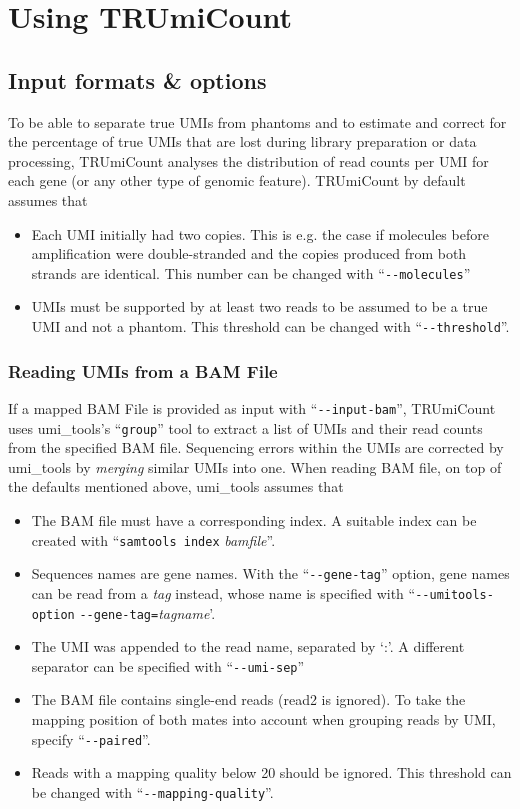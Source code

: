 \documentclass[10pt]{article}
\newcommand{\ddarg}[1]{\texttt{-{}-#1}}
\begin{document}
\pagebreak
\section{Using TRUmiCount}\label{using-trumicount}

\subsection{Input formats \& options}\label{input-options}

To be able to separate true UMIs from phantoms and to estimate and correct for the percentage of true UMIs that are lost during library preparation or data processing, TRUmiCount analyses the distribution of read counts per UMI for each gene (or any other type of genomic feature). TRUmiCount by default assumes that

\begin{itemize}
  \item Each UMI initially had two copies. This is e.g. the case if molecules before amplification were double-stranded and the copies produced from both strands are identical. This number can be changed with ``\ddarg{molecules}''
  \item UMIs must be supported by at least two reads to be assumed to be a true UMI and not a phantom. This threshold can be changed with ``\ddarg{threshold}''.
\end{itemize}

\subsubsection*{Reading UMIs from a BAM File}\label{input-bam}

If a mapped BAM File is provided as input with ``\ddarg{input-bam}'', TRUmiCount uses umi\_tools's ``\texttt{group}'' tool to extract a list of UMIs and their read counts from the specified BAM file. Sequencing errors within the UMIs are corrected by umi\_tools by \emph{merging} similar UMIs into one. When reading BAM file, on top of the defaults mentioned above, umi\_tools assumes that
\begin{itemize}
  \item The BAM file must have a corresponding index. A suitable index can be created with ``\texttt{samtools index} \textit{bamfile}''.
  \item Sequences names are gene names. With the ``\ddarg{gene-tag}'' option, gene names can be read from a \emph{tag} instead, whose name is specified with ``\ddarg{umitools-option} \allowbreak\ddarg{gene-tag=}\allowbreak\textit{tagname}'.
  \item The UMI was appended to the read name, separated by `:'. A different separator can be specified with ``\ddarg{umi-sep}''
  \item The BAM file contains single-end reads (read2 is ignored). To take the mapping position of both mates into account when grouping reads by UMI, specify ``\ddarg{paired}''.
  \item Reads with a mapping quality below 20 should be ignored. This threshold can be changed with ``\ddarg{mapping-quality}''.
\end{itemize}
\end{document}
